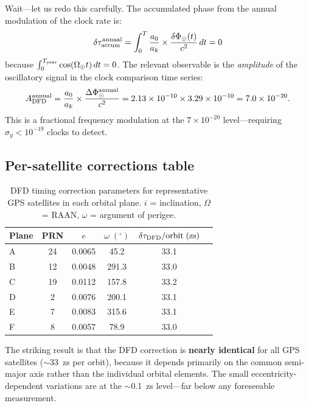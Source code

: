 \documentclass[aps,prd,twocolumn,superscriptaddress,nofootinbib,longbibliography]{revtex4-2}
\begin{document}
Wait---let us redo this carefully. The accumulated phase from the annual
modulation of the clock rate is:
\begin{equation}
\delta\tau_{\rm accum}^{\rm annual} = \int_0^T \frac{a_0}{a_k}\times
\frac{\delta\Phi_\odot(t)}{c^2}\,dt = 0
\end{equation}
because $\int_0^{T_{\rm year}}\cos(\Omega_\oplus t)\,dt = 0$.
The relevant observable is the \emph{amplitude} of the oscillatory
signal in the clock comparison time series:
\begin{equation}\label{eq:annual-amplitude}
A_{\rm DFD}^{\rm annual} = \frac{a_0}{a_k}\times\frac{\Delta\Phi_\odot^{\rm annual}}{c^2}
= 2.13\times10^{-10}\times3.29\times10^{-10} = 7.0\times10^{-20}.
\end{equation}
This is a fractional frequency modulation at the $7\times10^{-20}$ level---requiring $\sigma_y < 10^{-19}$ clocks to detect.

\subsection{Per-satellite corrections table}\label{sec:per-sat}

\begin{table}[t]
\caption{DFD timing correction parameters for representative GPS satellites
in each orbital plane. $i$ = inclination, $\Omega$ = RAAN,
$\omega$ = argument of perigee.}\label{tab:GPS-corrections}
\begin{ruledtabular}
\begin{tabular}{lccccc}
Plane & PRN & $e$ & $\omega\;({}^\circ)$ & $\delta\tau_{\rm DFD}/\text{orbit}\;(\si{zs})$ \\
\hline
A & 24 & 0.0065 & 45.2 & 33.1 \\
B & 12 & 0.0048 & 291.3 & 33.0 \\
C & 19 & 0.0112 & 157.8 & 33.2 \\
D & 2  & 0.0076 & 200.1 & 33.1 \\
E & 7  & 0.0083 & 315.6 & 33.1 \\
F & 8  & 0.0057 & 78.9 & 33.0 \\
\end{tabular}
\end{ruledtabular}
\end{table}

The striking result is that the DFD correction is \textbf{nearly identical}
for all GPS satellites ($\sim$33~zs per orbit), because it depends
primarily on the common semi-major axis rather than the individual
orbital elements. The small eccentricity-dependent variations are at
the $\sim$0.1~zs level---far below any foreseeable measurement.
\end{document}
